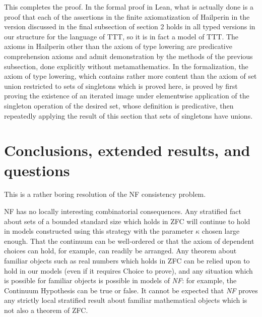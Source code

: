 \documentclass[112pt]{article}
\begin{document}
This completes the proof.  In the formal proof in Lean, what is actually done is a proof that each of the assertions in the finite axiomatization of Hailperin in the version discussed in the final subsection of section 2  holds in all typed versions in our structure for the language of TTT, so it is in fact a model of TTT.  The axioms in Hailperin other than the axiom of type lowering are predicative comprehension axioms and
admit demonstration by the methods of the previous subsection, done explicitly without metamathematics.  In the formalization, the axiom of type lowering, which contains rather more content than the axiom of set union restricted to sets of singletons which is proved here, is proved by first proving the existence of an iterated image under elementwise application of the singleton operation of the desired set, whose definition is predicative, then repeatedly applying the result of this section that sets of singletons have unions.
















\newpage

\section{Conclusions, extended results, and questions}
\begin{comment}
[I have copied in the conclusions section of an older version, but what it says should be about right, 
and may require some revisions to fit in this paper.  I also added the bibliography, which again is probably approximately the right one.]
\end{comment}

This is a rather boring resolution of the NF consistency problem.

NF has no locally interesting combinatorial consequences.   Any stratified fact about sets of a bounded standard size which holds in ZFC will continue to hold in models constructed using this strategy with the parameter $\kappa$ chosen large enough.
That the continuum can be well-ordered or that the axiom of dependent choices can hold, for example, can readily be arranged.  Any theorem about familiar objects such as real numbers which holds in ZFC can be relied upon to hold in our models
(even if it requires Choice to prove), and any situation which is possible for familiar objects is possible in models of {\em NF\/}:  for example, the Continuum Hypothesis can be true or false.  It cannot be expected that {\em NF\/} proves any strictly local stratified result about familiar mathematical objects which is not also a theorem of ZFC.
\end{document}
